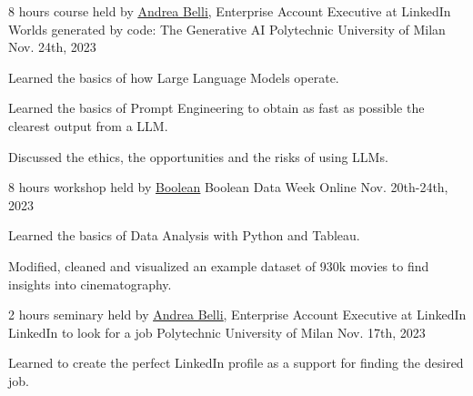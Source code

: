 

\begin{cventries}
  \cventry
    {8 hours course held by \underline{\href{https://www.linkedin.com/in/andrea-belli/}{Andrea Belli}}, Enterprise Account Executive at LinkedIn} %
    {Worlds generated by code: The Generative AI} %
    {Polytechnic University of Milan} %
    {Nov. 24th, 2023} %
    {
      \begin{cvitems} %
        \item {Learned the basics of how Large Language Models operate.}
        \item {Learned the basics of Prompt Engineering to obtain as fast as possible the clearest output from a LLM.}
        \item {Discussed the ethics, the opportunities and the risks of using LLMs.}
      \end{cvitems}
    }

  \cventry
    {8 hours workshop held by \underline{\href{https://boolean.careers/}{Boolean}}} %
    {Boolean Data Week} %
    {Online} %
    {Nov. 20th-24th, 2023} %
    {
      \begin{cvitems} %
        \item {Learned the basics of Data Analysis with Python and Tableau.}
        \item {Modified, cleaned and visualized an example dataset of 930k movies to find insights into cinematography.}
      \end{cvitems}
    }

  \cventry
    {2 hours seminary held by \underline{\href{https://www.linkedin.com/in/andrea-belli/}{Andrea Belli}}, Enterprise Account Executive at LinkedIn} %
    {LinkedIn to look for a job} %
    {Polytechnic University of Milan} %
    {Nov. 17th, 2023} %
    {
      \begin{cvitems} %
        \item {Learned to create the perfect LinkedIn profile as a support for finding the desired job.}
      \end{cvitems}
    }


\end{cventries}
